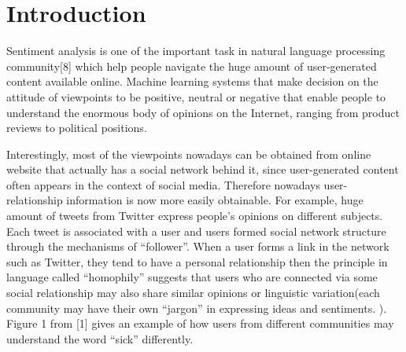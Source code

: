 
\section{Introduction}
Sentiment analysis is one of the important task in natural language processing community[8] which help people navigate the huge amount of user-generated content available online. Machine learning systems that make decision on the attitude of viewpoints to be positive, neutral or negative that enable people to understand the enormous body of opinions on the Internet, ranging from product reviews to political positions. 

Interestingly, most of the viewpoints nowadays can be obtained from online website that actually has a social network behind it, since user-generated content often appears in the context of social media. Therefore nowadays user-relationship information is now more easily obtainable. For example, huge amount of tweets from Twitter express people's opinions on different subjects. Each tweet is associated with a user and users formed social network structure through the mechanisms of ``follower''. When a user forms a link in the network such as Twitter, they tend to have a personal relationship then the principle in language called ``homophily'' suggests that users who are connected via some social relationship may also share similar opinions or linguistic variation(each community may have their own ``jargon'' in expressing ideas and sentiments. ). Figure 1 from [1] gives an example of how users from different communities may understand the word ``sick'' differently.

